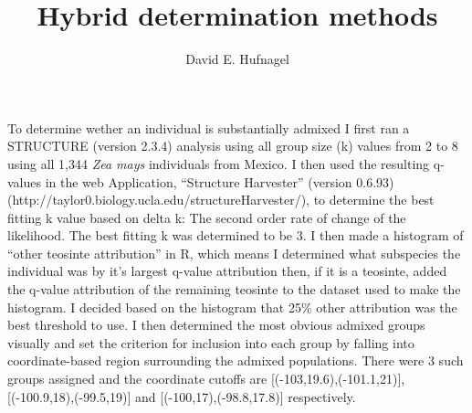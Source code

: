 \documentclass[11pt]{amsart}
\title{Hybrid determination methods}
\author{David E. Hufnagel}
\begin{document}
\maketitle

To determine wether an individual is substantially admixed I first ran a STRUCTURE (version 2.3.4) analysis using all group size (k) values from 2 to 8 using all 1,344 \textit{Zea mays} individuals from Mexico.  I then used the resulting q-values in 
the web Application, ``Structure Harvester'' (version 0.6.93)(http://taylor0.biology.ucla.edu/structureHarvester/), to determine the best fitting k value based on delta k: The second order rate of change of the likelihood.  The best fitting k was determined to be 3.  I then made a histogram of ``other teosinte attribution'' in R, which means I determined what subspecies the individual was by it's largest q-value attribution then, if it is a teosinte, added the q-value attribution of the remaining teosinte to the dataset used to make the histogram.  I decided based on the histogram that 25\% other attribution was the best threshold to use.  I then determined the most obvious admixed groups visually and set the criterion for inclusion into each group by falling into coordinate-based region surrounding the admixed populations.  There were 3 such groups assigned and the coordinate cutoffs are [(-103,19.6),(-101.1,21)], [(-100.9,18),(-99.5,19)] and [(-100,17),(-98.8,17.8)] respectively.
\end{document}
